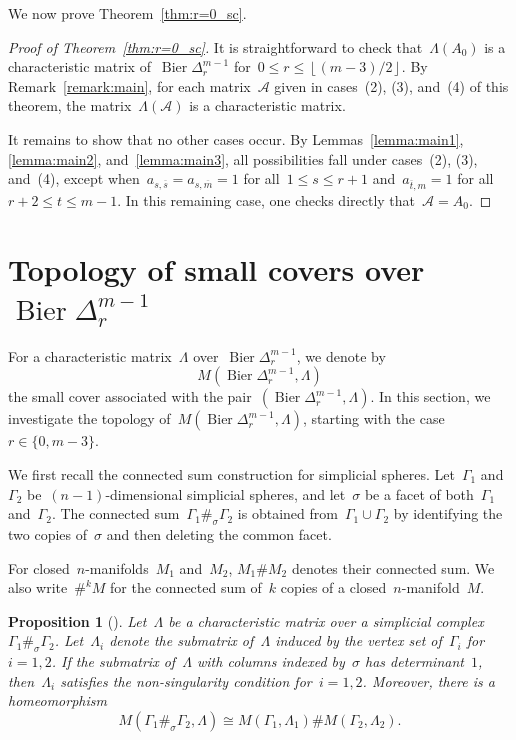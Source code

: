\documentclass[11pt]{amsart}
\theoremstyle{plain}
\newtheorem{proposition}[theorem]{Proposition}
\numberwithin{equation}{section}
\theoremstyle{definition}
\newcommand{\cA}{\mathcal{A}}
\DeclareMathOperator{\Bier}{Bier}
\begin{document}
We now prove Theorem~\ref{thm:r=0_sc}.
\begin{proof}[Proof of Theorem~\ref{thm:r=0_sc}]
    It is straightforward to check that~$\Lambda(A_0)$ is a characteristic matrix of~$\Bier\Delta^{m-1}_r$ for~$0\leq r\leq \left\lfloor (m-3)/2\right\rfloor$.
    By Remark~\ref{remark:main}, for each matrix~$\cA$ given in cases~(2), (3), and~(4) of this theorem, the matrix~$\Lambda(\cA)$ is a characteristic matrix.
    
    It remains to show that no other cases occur. 
    By Lemmas~\ref{lemma:main1}, \ref{lemma:main2}, and~\ref{lemma:main3}, all possibilities fall under cases~(2), (3), and~(4), except when~$a_{s,\overline{s}}=a_{s,\overline{m}}=1$ for all~$1\leq s\leq r+1$ and~$a_{\overline{t},m}=1$ for all~$r+2\leq t\leq m-1$.
    In this remaining case, one checks directly that~$\cA=A_0$.
\end{proof}


\section{Topology of small covers over~$\Bier \Delta_{r}^{m-1}$}\label{sec4}

For a characteristic matrix~$\Lambda$ over~$\Bier\Delta^{m-1}_{r}$, we denote by
$$
    M(\Bier\Delta^{m-1}_{r},\Lambda)
$$
the small cover associated with the pair~$(\Bier\Delta^{m-1}_{r},\Lambda)$.
In this section, we investigate the topology of~$M(\Bier\Delta^{m-1}_{r},\Lambda)$, starting with the case~$r \in \{0,m-3\}$.

We first recall the connected sum construction for simplicial spheres.
Let~$\Gamma_1$ and~$\Gamma_2$ be~$(n-1)$-dimensional simplicial spheres, and let~$\sigma$ be a facet of both~$\Gamma_1$ and~$\Gamma_2$.
The connected sum~$\Gamma_1\#_{\sigma}\Gamma_2$ is obtained from~$\Gamma_1\cup\Gamma_2$ by identifying the two copies of~$\sigma$ and then deleting the common facet.

For closed~$n$-manifolds~$M_1$ and~$M_2$, $M_1 \# M_2$ denotes their connected sum.
We also write~$\#^k M$ for the connected sum of~$k$ copies of a closed~$n$-manifold~$M$.
\begin{proposition}[\cite{Davis-Januszkiewicz1991}] \label{eqn:connected_sum}
    Let~$\Lambda$ be a characteristic matrix over a simplicial complex~$\Gamma_1 \#_{\sigma} \Gamma_2$.
    Let~$\Lambda_i$ denote the submatrix of~$\Lambda$ induced by the vertex set of~$\Gamma_i$ for~$i=1,2$.
    If the submatrix of~$\Lambda$ with columns indexed by~$\sigma$ has determinant~$1$, then~$\Lambda_i$ satisfies the non-singularity condition for~$i=1,2$.
    Moreover, there is a homeomorphism
    $$
        M(\Gamma_1\#_{\sigma}\Gamma_2,\Lambda) \cong M(\Gamma_1,\Lambda_1)\# M(\Gamma_2,\Lambda_2).
    $$
\end{proposition}
\end{document}
